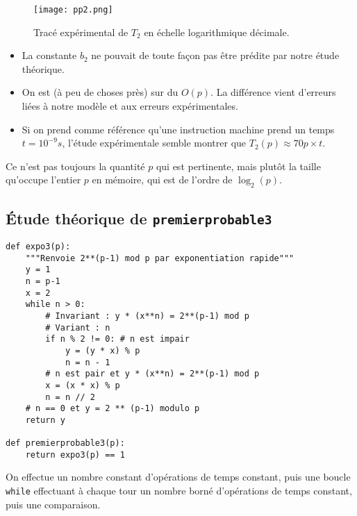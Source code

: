 \begin{figure}[!h]
  \begin{center}
    \texttt{[image: pp2.png]}
    \caption{Tracé expérimental de $T_2$ en échelle logarithmique décimale.}
    \label{fig.pp2}
  \end{center}
\end{figure}


\begin{itemize}
\item[\textbullet] La constante $b_{2}$ ne pouvait de toute façon pas être prédite
  par notre étude théorique.
\item[\textbullet] On est (à peu de choses près) sur du $O(p)$. La différence vient
  d'erreurs liées à notre modèle et aux erreurs expérimentales.
\item[\textbullet] Si on prend comme référence qu'une instruction machine prend
  un temps $t = 10^{-9}s$, l'étude expérimentale semble montrer que
  $T_{2}(p)\approx 70 p \times t$.
\end{itemize}

\begin{rem}
  Ce n'est pas toujours la quantité $p$ qui est pertinente, mais plutôt la taille qu'occupe l'entier $p$ en mémoire, qui est de l'ordre de $\log_2(p)$.
\end{rem}

\newpage

\subsection{Étude théorique de \texttt{premierprobable3}}

\begin{lstlisting}
def expo3(p):
    """Renvoie 2**(p-1) mod p par exponentiation rapide"""
    y = 1
    n = p-1
    x = 2
    while n > 0:
        # Invariant : y * (x**n) = 2**(p-1) mod p
        # Variant : n
        if n % 2 != 0: # n est impair
            y = (y * x) % p
            n = n - 1
        # n est pair et y * (x**n) = 2**(p-1) mod p
        x = (x * x) % p
        n = n // 2
    # n == 0 et y = 2 ** (p-1) modulo p
    return y

def premierprobable3(p):
    return expo3(p) == 1
\end{lstlisting}


On effectue un nombre constant d'opérations de temps constant, puis
une boucle \texttt{while} effectuant à chaque tour un nombre borné
d'opérations de temps constant, puis une comparaison.

